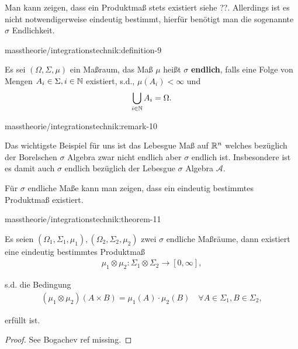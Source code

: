 \par
Man kann zeigen, dass ein Produktmaß stets existiert siehe ??. Allerdings ist es nicht notwendigerweise eindeutig bestimmt, hierfür benötigt man die sogenannte \(\sigma\) Endlichkeit.
\begin{definition}{}{masstheorie/integrationstechnik:definition-9}



\par
Es sei \((\Omega,\Sigma,\mu)\) ein Maßraum, das Maß \(\mu\) heißt \(\sigma\)\textbf{ endlich}, falls eine Folge von Mengen \(A_i\in\Sigma,i\in\mathbb{N}\) existiert, s.d., \(\mu(A_i)<\infty\) und
\begin{align*}
\bigcup_{i\in\mathbb{N}} A_i = \Omega.
\end{align*}\end{definition}
\begin{remark}{}{masstheorie/integrationstechnik:remark-10}



\par
Das wichtigste Beispiel für uns ist das Lebesgue Maß auf \(\mathbb{R}^n\) welches bezüglich der Borelschen \(\sigma\) Algebra zwar nicht endlich aber \(\sigma\) endlich ist. Insbesondere ist es damit auch \(\sigma\) endlich bezüglich der Lebesgue \(\sigma\) Algebra \(\mathcal{A}\).
\end{remark}

\par
Für \(\sigma\) endliche Maße kann man zeigen, dass ein eindeutig bestimmtes Produktmaß existiert.
\begin{theorem}{}{masstheorie/integrationstechnik:theorem-11}



\par
Es seien \((\Omega_1,\Sigma_1,\mu_1), (\Omega_2,\Sigma_2,\mu_2)\) zwei \(\sigma\) endliche Maßräume, dann existiert eine eindeutig bestimmtes Produktmaß
\begin{align*}
\mu_1\otimes \mu_2:\Sigma_1\otimes\Sigma_2\to[0,\infty],
\end{align*}
\par
s.d. die Bedingung
\begin{align*}
(\mu_1\otimes\mu_2)(A\times B) = \mu_1(A)\cdot\mu_2(B)\quad\forall A\in\Sigma_1, B\in\Sigma_2,
\end{align*}
\par
erfüllt ist.
\end{theorem}

\begin{proof}
 See Bogachev ref missing.
\end{proof}

